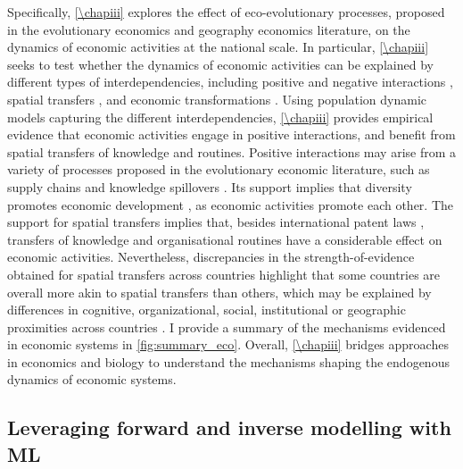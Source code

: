 Specifically, \cref{\chapiii} explores the effect of eco-evolutionary processes, proposed in the evolutionary economics and geography economics literature, on the dynamics of economic activities at the national scale.
% 
In particular, \cref{\chapiii} seeks to test whether the dynamics of economic activities can be explained by different types of interdependencies, including positive \xxx and negative interactions \xxx, spatial transfers \xxx, and economic transformations \xxx.
% 
Using population dynamic models capturing the different interdependencies, \cref{\chapiii} provides empirical evidence that economic activities engage in positive interactions, and benefit from spatial transfers of knowledge and routines.
% 
Positive interactions may arise from a variety of processes proposed in the evolutionary economic literature, such as supply chains \citep{Ozman2009,Saavedra2009a} and knowledge spillovers \citep{Menon2015}. 
% 
Its support implies that diversity promotes economic development \citep{Hidalgo2018}, as economic activities promote each other.
% 
The support for spatial transfers implies that, besides international patent laws \xxx, transfers of knowledge and organisational routines have a considerable effect on economic activities. Nevertheless, discrepancies in the strength-of-evidence obtained for spatial transfers across countries highlight that some countries are overall more akin to spatial transfers than others, which may be explained by differences in cognitive, organizational, social, institutional or geographic proximities across countries \xxx .
% 
I provide a summary of the mechanisms evidenced in economic systems in \cref{fig:summary_eco}. Overall, \cref{\chapiii} bridges approaches in economics and biology to understand the mechanisms shaping the endogenous dynamics of economic systems.

% 

% 

\subsection{Leveraging forward and inverse modelling with ML}

